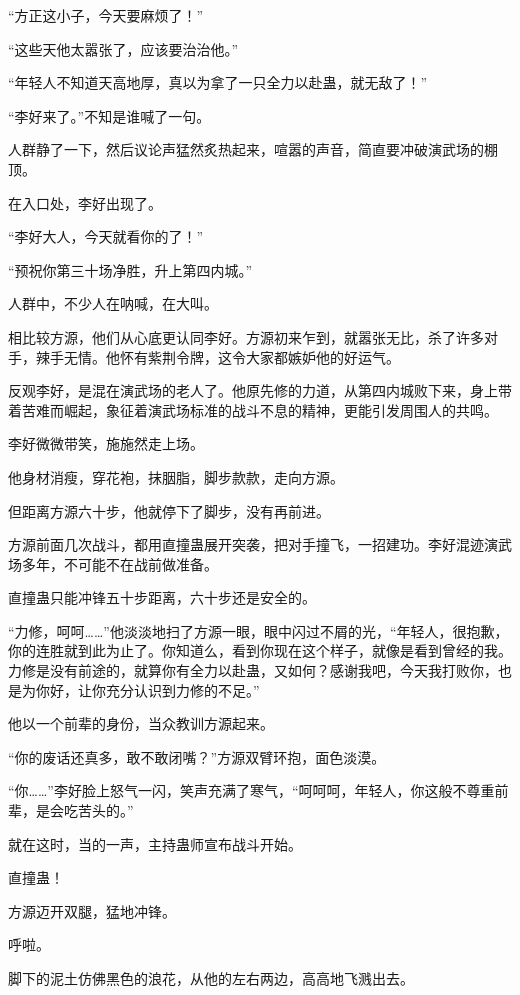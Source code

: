 \begin{this_body}
“方正这小子，今天要麻烦了！”

“这些天他太嚣张了，应该要治治他。”

“年轻人不知道天高地厚，真以为拿了一只全力以赴蛊，就无敌了！”

“李好来了。”不知是谁喊了一句。

人群静了一下，然后议论声猛然炙热起来，喧嚣的声音，简直要冲破演武场的棚顶。

在入口处，李好出现了。

“李好大人，今天就看你的了！”

“预祝你第三十场净胜，升上第四内城。”

人群中，不少人在呐喊，在大叫。

相比较方源，他们从心底更认同李好。方源初来乍到，就嚣张无比，杀了许多对手，辣手无情。他怀有紫荆令牌，这令大家都嫉妒他的好运气。

反观李好，是混在演武场的老人了。他原先修的力道，从第四内城败下来，身上带着苦难而崛起，象征着演武场标准的战斗不息的精神，更能引发周围人的共鸣。

李好微微带笑，施施然走上场。

他身材消瘦，穿花袍，抹胭脂，脚步款款，走向方源。

但距离方源六十步，他就停下了脚步，没有再前进。

方源前面几次战斗，都用直撞蛊展开突袭，把对手撞飞，一招建功。李好混迹演武场多年，不可能不在战前做准备。

直撞蛊只能冲锋五十步距离，六十步还是安全的。

“力修，呵呵……”他淡淡地扫了方源一眼，眼中闪过不屑的光，“年轻人，很抱歉，你的连胜就到此为止了。你知道么，看到你现在这个样子，就像是看到曾经的我。力修是没有前途的，就算你有全力以赴蛊，又如何？感谢我吧，今天我打败你，也是为你好，让你充分认识到力修的不足。”

他以一个前辈的身份，当众教训方源起来。

“你的废话还真多，敢不敢闭嘴？”方源双臂环抱，面色淡漠。

“你……”李好脸上怒气一闪，笑声充满了寒气，“呵呵呵，年轻人，你这般不尊重前辈，是会吃苦头的。”

就在这时，当的一声，主持蛊师宣布战斗开始。

直撞蛊！

方源迈开双腿，猛地冲锋。

呼啦。

脚下的泥土仿佛黑色的浪花，从他的左右两边，高高地飞溅出去。


\end{this_body}
